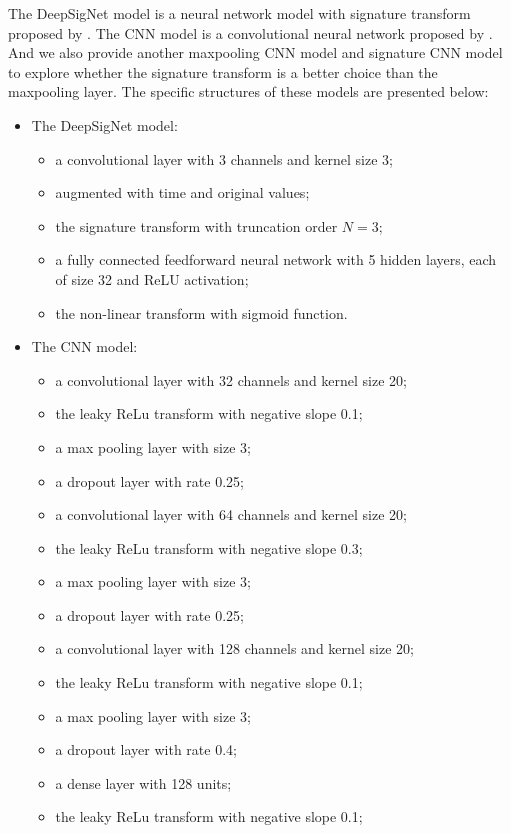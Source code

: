 \documentclass[]{article}
\renewcommand{\(}{\left(}
\renewcommand{\)}{\right)}
\begin{document}
	The DeepSigNet model is a neural network model with signature transform proposed by \cite{Lyons_2019_DeepSignature}. The CNN model is a convolutional neural network proposed by \cite{stone_2020}. And we also provide another maxpooling CNN model and signature CNN model to explore whether the signature transform is a better choice than the maxpooling layer. The specific structures of these models are presented below:
	\begin{itemize}
		\item The DeepSigNet model:
		\begin{itemize}
			\item[-]a convolutional layer with 3 channels and kernel size 3;
			\item[-]augmented with time and original values;
			\item[-]the signature transform with truncation order $N=3$;
			\item[-]a fully connected feedforward neural network with 5 hidden layers, each of size 32 and ReLU activation;
			\item[-]the non-linear transform with sigmoid function.
		\end{itemize}
		\item The CNN model:
		\begin{itemize}
			\item[-]a convolutional layer with 32 channels and kernel size 20;
			\item[-]the leaky ReLu transform with negative slope 0.1;
			\item[-]a max pooling layer with size 3;
			\item[-]a dropout layer with rate 0.25;			
			\item[-]a convolutional layer with 64 channels and kernel size 20;
			\item[-]the leaky ReLu transform with negative slope 0.3;
			\item[-]a max pooling layer with size 3;
			\item[-]a dropout layer with rate 0.25;
			\item[-]a convolutional layer with 128 channels and kernel size 20;
			\item[-]the leaky ReLu transform with negative slope 0.1;
			\item[-]a max pooling layer with size 3;
			\item[-]a dropout layer with rate 0.4;
			\item[-]a dense layer with 128 units;
			\item[-]the leaky ReLu transform with negative slope 0.1;

\end{itemize}
\end{itemize}
\end{document}
